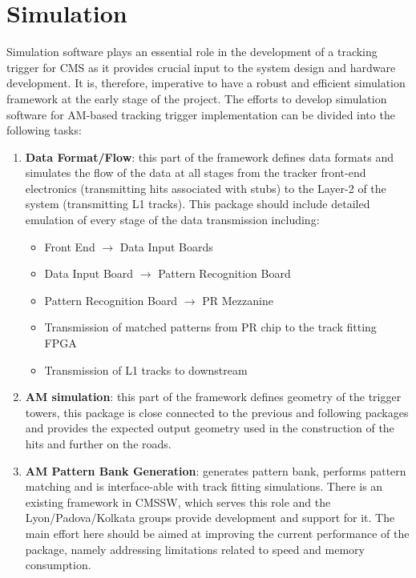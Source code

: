 \section{Simulation}

\noindent Simulation software plays an essential role in the development of a tracking trigger for CMS as it provides crucial input to the system design and hardware development. It is, therefore, imperative to have a robust and efficient simulation framework at the early stage of the project. The efforts to develop simulation software for AM-based tracking trigger implementation can be divided into the following tasks:

\begin{enumerate}
\item {\bf Data Format/Flow}: this part of the framework defines data formats and simulates the flow of the data at all stages from the tracker front-end electronics (transmitting hits associated with stubs) to the Layer-2 of the system (transmitting L1 tracks). This package should include detailed emulation of every stage of the data transmission including:
\begin{itemize}
\item Front End $\rightarrow$ Data Input Boards
\item Data Input Board $\rightarrow$ Pattern Recognition Board
\item Pattern Recognition Board $\rightarrow$ PR Mezzanine
\item Transmission of matched patterns from PR chip to the track fitting FPGA
\item Transmission of L1 tracks to downstream
\end{itemize}

\item {\bf AM simulation}: this part of the framework defines geometry of the trigger towers, this package is close connected to the previous and following packages and provides the expected output geometry used in the construction of the hits and further on the roads.

\item {\bf AM Pattern Bank Generation}: generates pattern bank, performs pattern matching and is interface-able with track fitting simulations. There is an existing framework in CMSSW, which serves this role and the Lyon/Padova/Kolkata groups provide development and support for it. The main effort here should be aimed at improving the current performance of the package, namely addressing limitations related to speed and memory consumption.


\end{enumerate}
